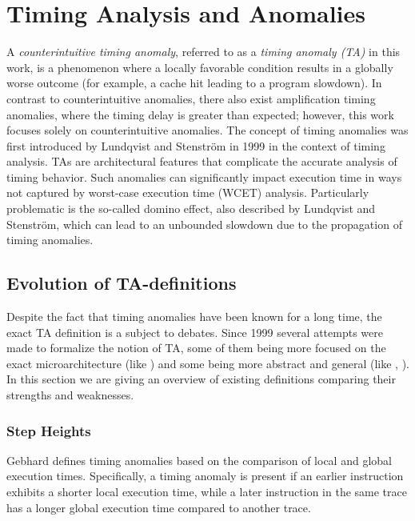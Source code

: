\chapter{Timing Analysis and Anomalies}

A \textit{counterintuitive timing anomaly}, referred to as a \textit{timing anomaly (TA)} in this work, is a phenomenon where a locally favorable condition results in a globally worse outcome (for example, a cache hit leading to a program slowdown). In contrast to counterintuitive anomalies, there also exist amplification timing anomalies, where the timing delay is greater than expected; however, this work focuses solely on counterintuitive anomalies. The concept of timing anomalies was first introduced by Lundqvist and Stenstr\"om in 1999 \cite{lundqvist_timing_1999} in the context of timing analysis. TAs are architectural features that complicate the accurate analysis of timing behavior. Such anomalies can significantly impact execution time in ways not captured by worst-case execution time (WCET) analysis. Particularly problematic is the so-called domino effect, also described by Lundqvist and Stenstr\"om, which can lead to an unbounded slowdown due to the propagation of timing anomalies.

\section{Evolution of TA-definitions}



Despite the fact that timing anomalies have been known for a long time, the exact TA definition is a subject to debates. Since 1999 several attempts were made to formalize the notion of TA, some of them being more focused on the exact microarchitecture (like \cite{gruin_minotaur_2023}) and some being more abstract and general (like \cite{binder_definitions_2022}, \cite{hahn_design_2020}). In this section we are giving an overview of existing definitions comparing their strengths and weaknesses.

\subsection{Step Heights}
Gebhard \cite{gebhard_timing_2012} defines timing anomalies based on the comparison of local and global execution times. Specifically, a timing anomaly is present if an earlier instruction exhibits a shorter local execution time, while a later instruction in the same trace has a longer global execution time compared to another trace.

